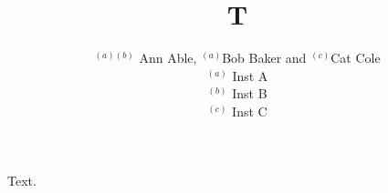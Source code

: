 \documentclass{PoS}
\title{T}
\author{$^{(a)(b)}$ Ann Able, $^{(a)}$Bob Baker and $^{(c)}$Cat Cole \\
$^{(a)}$ Inst A \\ $^{(b)}$ Inst B \\
$^{(c)}$ Inst C}
\begin{document}
Text.
\end{document}
